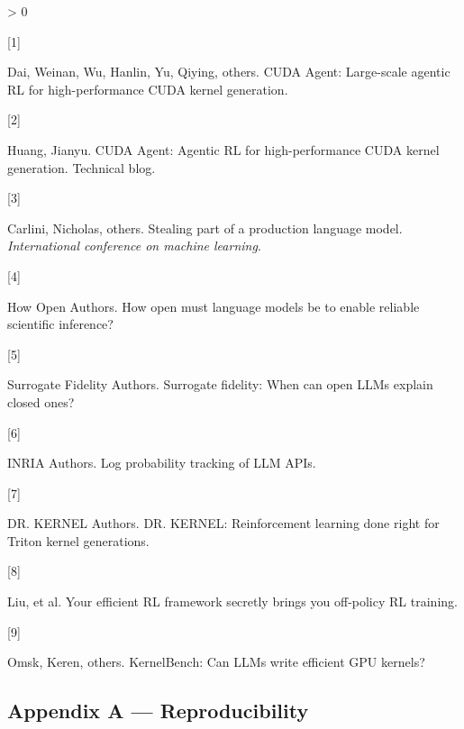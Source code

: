 \documentclass[
  11pt,
]{article}
\newlength{\cslhangindent}
\newlength{\csllabelwidth}
\newenvironment{CSLReferences}[2] %
 {%
  \setlength{\parindent}{0pt}
  \ifodd #1 \everypar{\setlength{\hangindent}{\cslhangindent}}\ignorespaces\fi
  \ifnum #2 > 0
  \setlength{\parskip}{#2\baselineskip}
  \fi
 }%
 {}
\newcommand{\CSLLeftMargin}[1]{\parbox[t]{\csllabelwidth}{#1}}
\newcommand{\CSLRightInline}[1]{\parbox[t]{\linewidth - \csllabelwidth}{#1}\break}
\begin{document}
\begin{CSLReferences}{0}{0}
\leavevmode{}%
\CSLLeftMargin{{[}1{]} }
\CSLRightInline{Dai, Weinan, Wu, Hanlin, Yu, Qiying, others. {CUDA
Agent}: Large-scale agentic {RL} for high-performance {CUDA} kernel
generation.}

\leavevmode{}%
\CSLLeftMargin{{[}2{]} }
\CSLRightInline{Huang, Jianyu. {CUDA Agent}: Agentic {RL} for
high-performance {CUDA} kernel generation. Technical blog.}

\leavevmode{}%
\CSLLeftMargin{{[}3{]} }
\CSLRightInline{Carlini, Nicholas, others. Stealing part of a production
language model. \emph{International conference on machine learning}.}

\leavevmode{}%
\CSLLeftMargin{{[}4{]} }
\CSLRightInline{How Open Authors. How open must language models be to
enable reliable scientific inference?}

\leavevmode{}%
\CSLLeftMargin{{[}5{]} }
\CSLRightInline{Surrogate Fidelity Authors. Surrogate fidelity: When can
open {LLMs} explain closed ones?}

\leavevmode{}%
\CSLLeftMargin{{[}6{]} }
\CSLRightInline{INRIA Authors. Log probability tracking of {LLM}
{APIs}.}

\leavevmode{}%
\CSLLeftMargin{{[}7{]} }
\CSLRightInline{DR. KERNEL Authors. {DR. KERNEL}: Reinforcement learning
done right for {Triton} kernel generations.}

\leavevmode{}%
\CSLLeftMargin{{[}8{]} }
\CSLRightInline{Liu, et al. Your efficient {RL} framework secretly
brings you off-policy {RL} training.}

\leavevmode{}%
\CSLLeftMargin{{[}9{]} }
\CSLRightInline{Omsk, Keren, others. {KernelBench}: Can {LLMs} write
efficient {GPU} kernels?}

\end{CSLReferences}


\hypertarget{appendix-a-reproducibility}{%
\subsection{Appendix A ---
Reproducibility}\label{appendix-a-reproducibility}}
\end{document}
